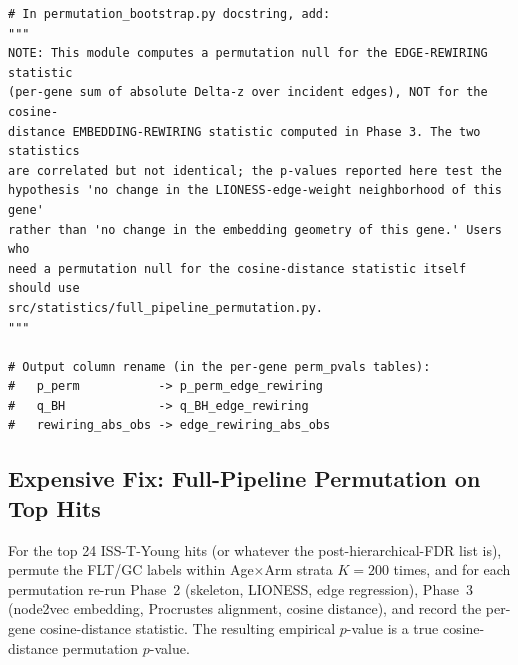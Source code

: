 \documentclass[11pt]{article}
\begin{document}
\begin{lstlisting}[style=pythonstyle,caption={Renaming and documentation update.}]
# In permutation_bootstrap.py docstring, add:
"""
NOTE: This module computes a permutation null for the EDGE-REWIRING statistic
(per-gene sum of absolute Delta-z over incident edges), NOT for the cosine-
distance EMBEDDING-REWIRING statistic computed in Phase 3. The two statistics
are correlated but not identical; the p-values reported here test the
hypothesis 'no change in the LIONESS-edge-weight neighborhood of this gene'
rather than 'no change in the embedding geometry of this gene.' Users who
need a permutation null for the cosine-distance statistic itself should use
src/statistics/full_pipeline_permutation.py.
"""

# Output column rename (in the per-gene perm_pvals tables):
#   p_perm           -> p_perm_edge_rewiring
#   q_BH             -> q_BH_edge_rewiring
#   rewiring_abs_obs -> edge_rewiring_abs_obs
\end{lstlisting}

\subsection{Expensive Fix: Full-Pipeline Permutation on Top Hits}

For the top 24 ISS-T-Young hits (or whatever the post-hierarchical-FDR list is), permute the FLT/GC labels within Age$\times$Arm strata $K=200$ times, and for each permutation re-run Phase~2 (skeleton, LIONESS, edge regression), Phase~3 (node2vec embedding, Procrustes alignment, cosine distance), and record the per-gene cosine-distance statistic. The resulting empirical $p$-value is a true cosine-distance permutation $p$-value.
\end{document}
